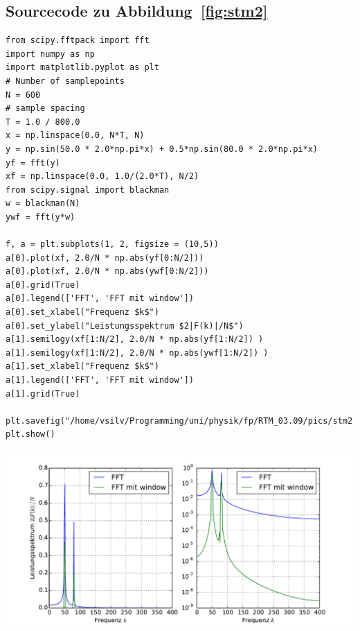 \subsection{Sourcecode zu Abbildung~\ref{fig:stm2}}
\begin{verbatim}
from scipy.fftpack import fft
import numpy as np
import matplotlib.pyplot as plt
# Number of samplepoints
N = 600
# sample spacing
T = 1.0 / 800.0
x = np.linspace(0.0, N*T, N)
y = np.sin(50.0 * 2.0*np.pi*x) + 0.5*np.sin(80.0 * 2.0*np.pi*x)
yf = fft(y)
xf = np.linspace(0.0, 1.0/(2.0*T), N/2)
from scipy.signal import blackman
w = blackman(N)
ywf = fft(y*w)

f, a = plt.subplots(1, 2, figsize = (10,5))
a[0].plot(xf, 2.0/N * np.abs(yf[0:N/2]))
a[0].plot(xf, 2.0/N * np.abs(ywf[0:N/2]))
a[0].grid(True)
a[0].legend(['FFT', 'FFT mit window'])
a[0].set_xlabel("Frequenz $k$")
a[0].set_ylabel("Leistungsspektrum $2|F(k)|/N$")
a[1].semilogy(xf[1:N/2], 2.0/N * np.abs(yf[1:N/2]) )
a[1].semilogy(xf[1:N/2], 2.0/N * np.abs(ywf[1:N/2]) )
a[1].set_xlabel("Frequenz $k$")
a[1].legend(['FFT', 'FFT mit window'])
a[1].grid(True)

plt.savefig("/home/vsilv/Programming/uni/physik/fp/RTM_03.09/pics/stm2.pdf")
plt.show()
\end{verbatim}
\includegraphics[width=17cm]{pics/stm2}

